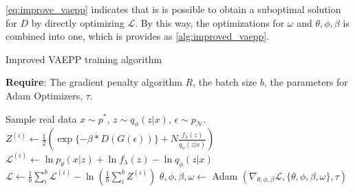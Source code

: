 \cref{eq:improve_vaepp} indicates that is is possible to obtain a suboptimal solution for $D$ by directly optimizing $\mathcal{L}$. By this way, the optimizations for $\omega$ and $\theta, \phi, \beta$ is combined into one, which is provides as \cref{alg:improved_vaepp}. 

\begin{algorithm}[tb]
\caption{Improved VAEPP training algorithm}
\label{alg:improved_vaepp}
\textbf{Require}: The gradient penalty algorithm $R$, the batch size $b$, the parameters for Adam Optimizers, $\tau$. 

\begin{algorithmic}[1] %
\STATE Sample real data $x \sim p^*$, $z \sim q_\phi(z|x)$, $\epsilon \sim p_\mathcal{N}$.
\STATE $Z^{(i)} \gets \frac{1}{2}(\exp\{-\beta * D(G(\epsilon))\} + N \frac{f_\lambda(z)}{q_\phi(z|x)})$
\STATE $\mathcal{L}^{(i)} \gets \ln p_\theta(x|z) + \ln f_\lambda(z) - \ln q_\phi(z|x)$
\ENDFOR
\STATE $\mathcal{L} \gets \frac{1}{b}\sum_{i}^b \mathcal{L}^{(i)} - \ln (\frac{1}{b}\sum_{i}^b Z^{(i)})$
\STATE $\theta, \phi, \beta, \omega \gets $ Adam $(\nabla_{\theta, \phi, \beta} \mathcal{L}, \{\theta, \phi, \beta, \omega\}, \tau)$
\ENDWHILE
\end{algorithmic}
\end{algorithm}
 
 